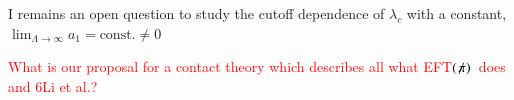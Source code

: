 \documentclass[preprint,12pt]{elsarticle}
\newcommand{\lc}{\ensuremath{\lambda_c}}
\newcommand{\red}[1]{\textcolor{red}{#1}}
\newcommand{\eftnopi}{\mbox{EFT$(\not \! \pi)$}}
\newcommand{\figref}[1]{fig.~\ref{#1}}
\newcommand{\tabref}[1]{table~\ref{#1}}
\begin{document}
I remains an open question to study the cutoff dependence of $\lc$ with a constant,
$\lim_{\Lambda\to\infty}a_1=\text{const.}\neq0$

\red{What is our proposal for a contact theory which describes all what \eftnopi~does and 6Li et al.?}



%
\end{document}
